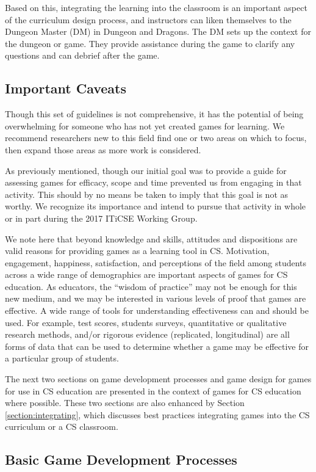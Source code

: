 \documentclass{sig-alternate-05-2015}
\begin{document}
Based on this, integrating the learning into the classroom is an important aspect of the curriculum design process, and instructors can liken themselves to the Dungeon Master (DM) in Dungeon and Dragons. The DM sets up the context for the dungeon or game. They provide assistance during the game to clarify any questions and can debrief after the game.\subsection{Important Caveats}


Though this set of guidelines is not comprehensive, it has the potential of being overwhelming for someone who has not yet created games for learning. We recommend researchers new to this field find one or two areas on which to focus, then expand those areas as more work is considered.



As previously mentioned, though our initial goal was to provide a guide for assessing games for efficacy, scope and time prevented us from engaging in that activity. This should by no means be taken to imply that this goal is not as worthy. We recognize its importance and intend to pursue that activity in whole or in part during the 2017 ITiCSE Working Group. 



We note here that beyond knowledge and skills, attitudes and dispositions are valid reasons for providing games as a learning tool in CS. Motivation, engagement, happiness, satisfaction, and perceptions of the field among students across a wide range of demographics are important aspects of games for CS education. As educators, the ``wisdom of practice'' may not be enough for this new medium, and we may be interested in various levels of proof that games are effective. A wide range of tools for understanding effectiveness can and should be used. For example, test scores, students surveys, quantitative or qualitative research methods, and/or rigorous evidence (replicated, longitudinal) are all forms of data that can be used to determine whether a game may be effective for a particular group of students. 



The next two sections on game development processes and game design for games for use in CS education are presented in the context of games for CS education where possible. These two sections are also enhanced by Section \ref{section:integrating}, which discusses best practices integrating games into the CS curriculum or a CS classroom. \subsection{Basic Game Development Processes}
\end{document}
